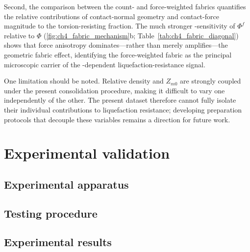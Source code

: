 \documentclass[../main]{subfiles}
\begin{document}
Second, the comparison between the count- and force-weighted fabrics quantifies the relative contributions of contact-normal geometry and contact-force magnitude to the torsion-resisting fraction. The much stronger \Kzero{}-sensitivity of $\Phi^f$ relative to $\Phi$ (\cref{fig:ch4_fabric_mechanism}b; Table~\ref{tab:ch4_fabric_diagonal}) shows that force anisotropy dominates---rather than merely amplifies---the geometric fabric effect, identifying the force-weighted fabric as the principal microscopic carrier of the \Kzero{}-dependent liquefaction-resistance signal.

One limitation should be noted. Relative density and $Z_{m0}$ are strongly coupled under the present consolidation procedure, making it difficult to vary one independently of the other. The present dataset therefore cannot fully isolate their individual contributions to liquefaction resistance; developing preparation protocols that decouple these variables remains a direction for future work.


\section{Experimental validation}
\label{sec:ch4_experiment}


\subsection{Experimental apparatus}
\label{subsec:ch4_apparatus}


\subsection{Testing procedure}
\label{subsec:ch4_procedure}


\subsection{Experimental results}
\label{subsec:ch4_exp_results}
\end{document}
